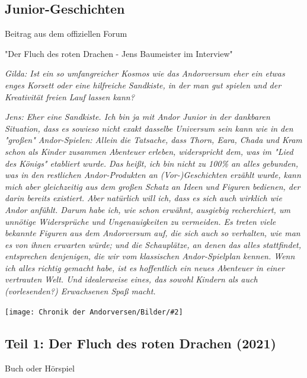\documentclass[10pt, a4paper, oneside]{book}
\newcommand{\produkt}[1]{%
    \section{#1}%
    \label{Produkt: #1}%
}
\newcommand{\bildmitts}[2][height=0.32\textwidth,width=0.48\textwidth,keepaspectratio]{%
    \begin{center}
        \texttt{[image: Chronik der Andorversen/Bilder/\#2]}
    \end{center}
}
\begin{document}
\begin{multicols}{2}

\begin{chapterbox}


    \chapter{Junior-Geschichten}
    
    \begin{center}
        Beitrag aus dem offiziellen Forum

        "Der Fluch des roten Drachen - Jens Baumeister im Interview"
    \end{center}

    \textit{Gilda: Ist ein so umfangreicher Kosmos wie das Andorversum eher ein etwas enges Korsett oder eine hilfreiche Sandkiste, in der man gut spielen und der Kreativität freien Lauf lassen kann?}

    \textit{Jens: Eher eine Sandkiste. Ich bin ja mit Andor Junior in der dankbaren Situation, dass es sowieso nicht exakt dasselbe Universum sein kann wie in den "großen" Andor-Spielen: Allein die Tatsache, dass Thorn, Eara, Chada und Kram schon als Kinder zusammen Abenteuer erleben, widerspricht dem, was im "Lied des Königs" etabliert wurde. Das heißt, ich bin nicht zu 100\% an alles gebunden, was in den restlichen Andor-Produkten an (Vor-)Geschichten erzählt wurde, kann mich aber gleichzeitig aus dem großen Schatz an Ideen und Figuren bedienen, der darin bereits existiert. Aber natürlich will ich, dass es sich auch wirklich wie Andor anfühlt. Darum habe ich, wie schon erwähnt, ausgiebig recherchiert, um unnötige Widersprüche und Ungenauigkeiten zu vermeiden. Es treten viele bekannte Figuren aus dem Andorversum auf, die sich auch so verhalten, wie man es von ihnen erwarten würde; und die Schauplätze, an denen das alles stattfindet, entsprechen denjenigen, die wir vom klassischen Andor-Spielplan kennen. Wenn ich alles richtig gemacht habe, ist es hoffentlich ein neues Abenteuer in einer vertrauten Welt. Und idealerweise eines, das sowohl Kindern als auch (vorlesenden?) Erwachsenen Spaß macht.}

    \bildmitts[width=\textwidth]{Andor Junior Schlussbild.jpg}

\end{chapterbox}




\produkt{Teil 1: Der Fluch des roten Drachen (2021)}

\begin{center}
    Buch oder Hörspiel
\end{center}


\end{multicols}
\end{document}
